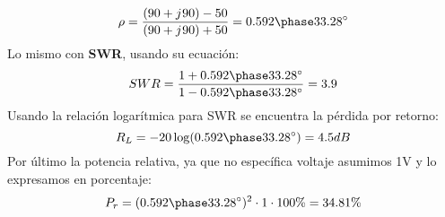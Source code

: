 \documentclass[
	12pt, %
	fleqn, %
	a4paper, %
	oneside, %
]{LegrandOrangeBook}
\begin{document}
\begin{example}
\begin{displaymath}
\rho=\frac{(90+\iu 90)-50}{(90+\iu 90)+50}=\fase{0.592}{33.28}
\end{displaymath}
Lo mismo con \textbf{SWR}, usando su ecuación:
\begin{displaymath}
SWR=\frac{1+\fase{0.592}{33.28}}{1-\fase{0.592}{33.28}}=3.9
\end{displaymath}
Usando la relación logarítmica para SWR se encuentra la pérdida por retorno:
\begin{displaymath}
R_L=-20\log(\fase{0.592}{33.28})=4.5dB
\end{displaymath}
Por último la potencia relativa, ya que no específica voltaje asumimos 1V y lo expresamos en porcentaje:
\begin{displaymath}
P_r=(\fase{0.592}{33.28})^2\cdot 1\cdot 100\%=34.81\%
\end{displaymath}
\end{example}
\end{document}
